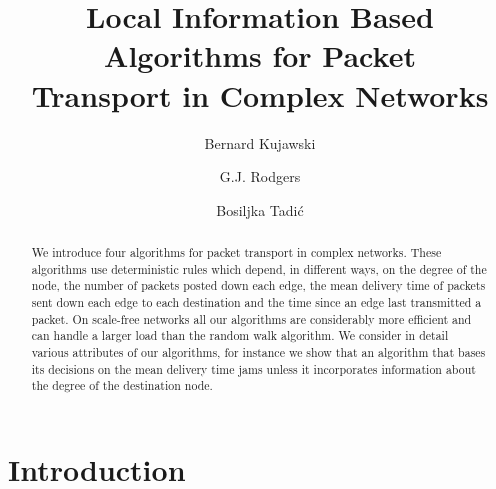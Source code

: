 \documentclass[runningheads]{llncs}
\begin{document}
\pagestyle{headings}

\mainmatter

\title{Local Information Based Algorithms for Packet\\
Transport in Complex Networks}


\author{Bernard Kujawski
\and G.J. Rodgers \and Bosiljka Tadi\'{c}  }



\maketitle

\begin{abstract}

{\bf} We introduce four algorithms for packet transport in complex
networks. These algorithms use deterministic rules which depend, in
different ways, on the degree of the node, the number of packets
posted down each edge, the mean delivery time of packets sent down
each edge to each destination and the time since an edge last
transmitted a packet. On scale-free networks all our algorithms are
considerably more efficient and can handle a larger load  than the
random walk algorithm. We consider in detail various attributes of
our algorithms, for instance we show that an algorithm that bases
its decisions on the mean delivery time jams unless it incorporates
information about the degree of the destination node.
\end{abstract}


\section{Introduction}
\end{document}
